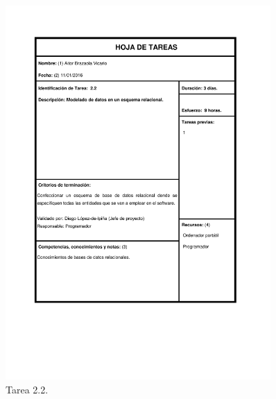 \documentclass{DeustoFDP}
\begin{document}
\begin{figure}[H]
    \centering
    \includegraphics[width=0.9\textwidth]{fig/Tareas/22}
    \caption{Tarea 2.2.}
    \label{fig:t22}
\end{figure}
\end{document}
